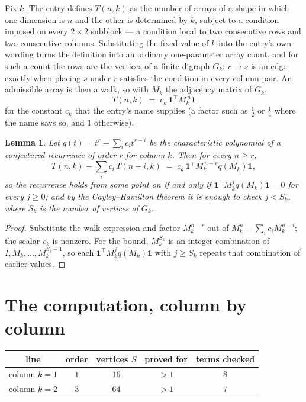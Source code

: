 \documentclass[11pt,a4paper]{article}
\theoremstyle{plain}
\newtheorem{lemma}[theorem]{Lemma}
\theoremstyle{definition}
\begin{document}
Fix $k$. The entry defines $T(n,k)$ as the number of arrays of a shape in which one dimension
is $n$ and the other is determined by $k$, subject to a condition imposed on every
$2\times2$ subblock --- a condition local to two consecutive rows and two consecutive columns.
Substituting the fixed value of $k$ into the entry's own wording turns the definition into an
ordinary one-parameter array count, and for such a count the rows are the vertices of a finite
digraph $G_k$: $r\to s$ is an edge exactly when placing $s$ under $r$ satisfies the condition
in every column pair. An admissible array is then a walk, so with $M_k$ the adjacency matrix
of $G_k$,
\[
T(n,k)\;=\;c_k\,\mathbf{1}^{\!\top}M_k^{\,n}\mathbf{1}
\]
for the constant $c_k$ that the entry's name supplies (a factor such as $\tfrac12$ or
$\tfrac14$ where the name says so, and $1$ otherwise).

\begin{lemma}\label{lem:crit}
Let $q(t)=t^{r}-\sum_i c_it^{r-i}$ be the characteristic polynomial of a conjectured
recurrence of order $r$ for column $k$. Then for every $n\ge r$,
\[
T(n,k)-\sum_i c_i\,T(n-i,k)\;=\;c_k\,\mathbf{1}^{\!\top}M_k^{\,n-r}q(M_k)\mathbf{1},
\]
so the recurrence holds from some point on if and only if
$\mathbf{1}^{\!\top}M_k^{j}q(M_k)\mathbf{1}=0$ for every $j\ge0$; and by the
Cayley--Hamilton theorem it is enough to check $j<S_k$, where $S_k$ is the number of vertices
of $G_k$.
\end{lemma}

\begin{proof}
Substitute the walk expression and factor $M_k^{n-r}$ out of $M_k^{n}-\sum_ic_iM_k^{n-i}$;
the scalar $c_k$ is nonzero. For the bound, $M_k^{S_k}$ is an integer combination of
$I,M_k,\dots,M_k^{S_k-1}$, so each $\mathbf{1}^{\!\top}M_k^{j}q(M_k)\mathbf{1}$ with
$j\ge S_k$ repeats that combination of earlier values.
\end{proof}

\section{The computation, column by column}

\begin{center}
\begin{tabular}{ccccc}
line & order & vertices $S$ & proved for & terms checked \\ \hline
column $k$$=1$ & $1$ & $16$ & $>1$ & $8$ \\
column $k$$=2$ & $3$ & $64$ & $>1$ & $7$ \\
\end{tabular}
\end{center}
\end{document}
